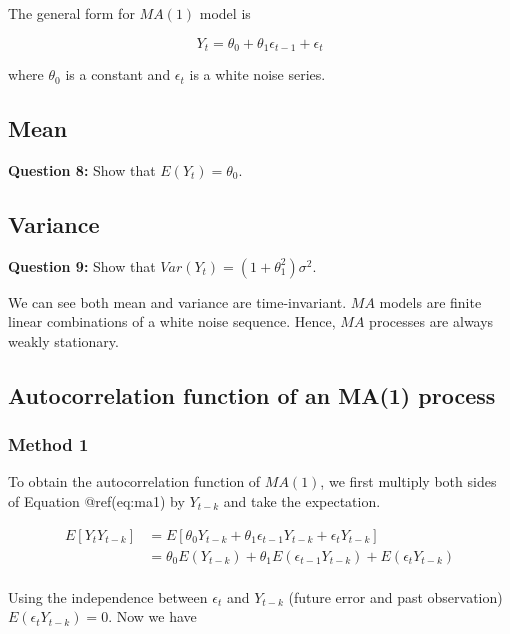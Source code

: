 \documentclass[
  11pt,
  a4paper,
]{report}
\begin{document}
The general form for \(MA(1)\) model is

\begin{equation}
Y_t = \theta_0 + \theta_1 \epsilon_{t-1} + \epsilon_t
\end{equation}

where \(\theta_0\) is a constant and \({\epsilon_t}\) is a white noise
series.

\subsection{Mean}\label{mean-3}

\textbf{Question 8:} Show that \(E(Y_t) = \theta_0\).

\subsection{Variance}\label{variance-2}

\textbf{Question 9:} Show that \(Var(Y_t) = (1+\theta_1^2)\sigma^2\).

We can see both mean and variance are time-invariant. \(MA\) models are
finite linear combinations of a white noise sequence. Hence, \(MA\)
processes are always weakly stationary.

\subsection{Autocorrelation function of an MA(1)
process}\label{autocorrelation-function-of-an-ma1-process}

\subsubsection{Method 1}\label{method-1}

To obtain the autocorrelation function of \(MA(1)\), we first multiply
both sides of Equation @ref(eq:ma1) by \(Y_{t-k}\) and take the
expectation.

\begin{equation}
\begin{aligned}
E[Y_tY_{t-k}] &= E[\theta_0 Y_{t-k} + \theta_1 \epsilon_{t-1} Y_{t-k} + \epsilon_t Y_{t-k}]\\
&= \theta_0 E(Y_{t-k}) + \theta_1 E(\epsilon_{t-1}Y_{t-k}) + E(\epsilon_t Y_{t-k})\\
\end{aligned}
\end{equation}

Using the independence between \(\epsilon_t\) and \(Y_{t-k}\) (future
error and past observation) \(E(\epsilon_t Y_{t-k}) = 0\). Now we have
\end{document}

